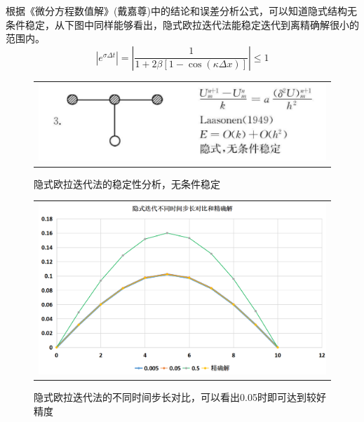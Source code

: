 \documentclass[3p]{elsarticle}
\numberwithin{equation}{section}
\begin{document}
    根据《微分方程数值解》(戴嘉尊)中的结论和误差分析公式，可以知道隐式结构无条件稳定，从下图中同样能够看出，隐式欧拉迭代法能稳定迭代到离精确解很小的范围内。
    \begin{equation}
    	\left|e^{\sigma \Delta t}\right|=\left|\frac{1}{1+2 \beta[1-\cos (\kappa \Delta x)]}\right| \leq 1
    \end{equation}
    \begin{figure}[h]
    	\begin{center}
    		\begin{tabular}{c}
    			\includegraphics[angle=0, scale=0.25]{./figures/Implicit_Stablity.png}
    		\end{tabular}
    	\end{center}
    	\caption{隐式欧拉迭代法的稳定性分析，无条件稳定}
    	\label{fig:illustration-Implicit_Stablity}
    \end{figure}
    
    
    \begin{figure}[h]
    	\begin{center}
    		\begin{tabular}{c}
    			\includegraphics[angle=0, scale=0.25]{./figures/Implicit_Euler_Stability.png}
    		\end{tabular}
    	\end{center}
    	\caption{隐式欧拉迭代法的不同时间步长对比，可以看出0.05时即可达到较好精度}
    	\label{fig:illustration-Implicit_Euler_Stability}
    \end{figure}
\end{document}
